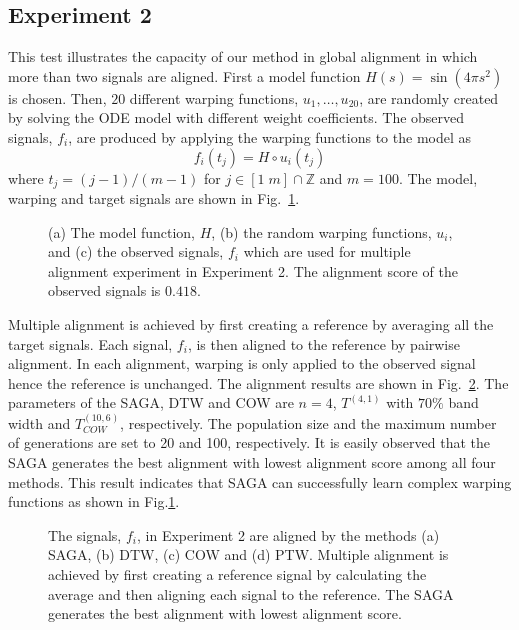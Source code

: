 \documentclass[number,1p,12pt]{elsarticle}
\begin{document}
\subsection{Experiment 2}
This test illustrates the capacity of our method in global alignment in which more than two signals are aligned. First a model function $H(s) =\sin(4\pi s^2)$ is chosen. Then, $20$ different warping functions, $u_1,\ldots,u_{20}$, are randomly created by solving the ODE model with different weight coefficients. The observed signals, $f_i$, are produced by applying the warping functions to the model as
\begin{equation}
f_i(t_j) =H \circ u_i (t_j) 
\end{equation}
where $t_j=(j-1)/(m-1)$ for $j\in[1\; m]\cap \mathbb{Z}$ and $m=100$. The model, warping and target signals are shown in Fig.~\ref{Figure06}. 

\begin{figure}
\caption{(a) The model function, $H$, (b) the random warping functions, $u_i$, and (c) the observed signals, $f_i$ which are used for multiple alignment experiment in Experiment 2.  The alignment score of the observed signals is $0.418$. }
\label{Figure06}
\end{figure} 

Multiple alignment is achieved by first creating a reference by averaging all the target signals. Each signal, $f_i$, is then aligned to the reference by pairwise alignment. In each alignment, warping is only applied to the observed signal hence the reference is unchanged. The alignment results are shown in Fig.~\ref{Figure07}. The parameters of the SAGA, DTW and COW are $n=4$, $T^{(4,1)}$ with $70\%$ band width and $T_{COW}^{(10,6)}$, respectively. The population size and the maximum number of generations are set to 20 and 100, respectively. It is easily observed that the SAGA generates the best alignment with lowest alignment score among all four methods.   This result indicates that SAGA can successfully learn complex warping functions as shown in Fig.\ref{Figure06}. 

\begin{figure}
\caption{The signals, $f_i$, in Experiment 2 are aligned by the methods (a) SAGA, (b) DTW, (c) COW and (d) PTW.  Multiple alignment is achieved by first creating a reference signal by calculating the average and then aligning each signal to the reference. The SAGA generates the best alignment with lowest alignment score.}
\label{Figure07}
\end{figure} 
\end{document}
